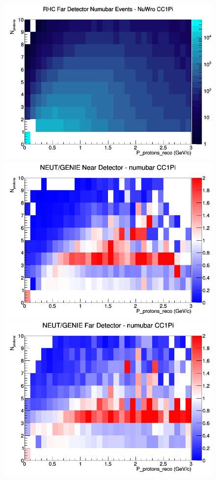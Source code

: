 \documentclass[12pt]{article}
\begin{document}
\begin{figure}[h]
\endminipage
{}
\includegraphics[width=\linewidth]{eff_N_P/GAr/protons/CC1Pi_RHC_FD_numubar_N_P_NuWro.png}
\endminipage
\newline
{}
\includegraphics[width=\linewidth]{eff_N_P/GAr/protons/ratios/CC1Pi_NEUT_GENIE_numubar_near_N_P.png}
\endminipage
{}
\includegraphics[width=\linewidth]{eff_N_P/GAr/protons/ratios/CC1Pi_NEUT_GENIE_numubar_far_N_P.png}

\end{figure}
\end{document}
